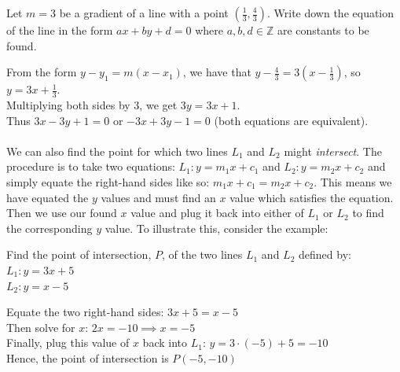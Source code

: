 \documentclass[12pt, a4paper, titlepage, twoside]{article}
\newcommand*{\Z}{\mathbb{Z}}
\newcounter{excount}[subsection]
\begin{document}
	\begin{ex}
		Let $m = 3$ be a gradient of a line with a point $(\frac{1}{3},\frac{4}{3})$. Write down the equation of the line in the form 
		$ax + by + d = 0$ where $a,b,d \in \Z$ are constants to be found.
		
		\hfill
		\tcbline
		\hfill
		
		From the form $y - y_1 = m(x-x_1)$, we have that $y - \frac{4}{3} = 3(x - \frac{1}{3})$, so $y = 3x + \frac{1}{3}$.\\
		
		Multiplying both sides by 3, we get $3y = 3x + 1$.\\ 
		
		Thus $3x - 3y + 1 = 0$ or $-3x + 3y - 1 = 0$ (both equations are equivalent).
	\end{ex}
	
	\paragraph{}
	We can also find the point for which two lines $L_1$ and $L_2$ might \textit{intersect}. The procedure is to take two equations:
	$L_1: y = m_1 x + c_1$ and $L_2: y = m_2 x + c_2$ and simply equate the right-hand sides like so: $m_1 x + c_1 = m_2 x + c_2$.
	This means we have equated the $y$ values and must find an $x$ value which satisfies the equation. Then we use our found $x$
	value and plug it back into either of $L_1$ or $L_2$ to find the corresponding $y$ value. To illustrate this, consider the example:\\
	
	\stepcounter{excount}
	\begin{ex}
		Find the point of intersection, $P$, of the two lines $L_1$ and $L_2$ defined by:\\
		$L_1: y = 3x + 5$\\
		$L_2: y = x - 5$\\
		
		\tcbline
		\hfill
		
		Equate the two right-hand sides: $3x + 5 = x - 5$\\
		Then solve for $x$: $2x = -10 \implies x = -5$\\
		Finally, plug this value of $x$ back into $L_1$: $y = 3 \cdot (-5) + 5 = -10$ \\
		
		Hence, the point of intersection is $P(-5, -10)$
	\end{ex}
\end{document}
